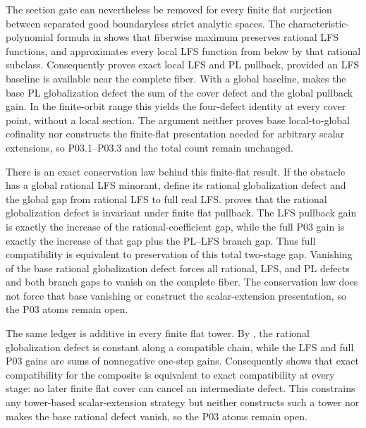 The section gate can nevertheless be removed for every finite flat
surjection between separated good boundaryless strict analytic spaces.
The characteristic-polynomial formula in
 shows that fiberwise maximum
preserves rational LFS functions, and
 approximates every local LFS
function from below by that rational subclass.  Consequently
 proves exact local LFS
and PL pullback, provided an LFS baseline is available near the complete
fiber.  With a global baseline,
 makes the base PL
globalization defect the sum of the cover defect and the global pullback
gain.  In the finite-orbit range this yields the four-defect identity at
every cover point, without a local section.  The argument neither proves
base local-to-global cofinality nor constructs the finite-flat presentation
needed for arbitrary scalar extensions, so P03.1--P03.3 and the total count
remain unchanged.

There is an exact conservation law behind this finite-flat result.  If the
obstacle has a global rational LFS minorant, define its rational
globalization defect and the global gap from rational LFS to full real LFS.
 proves that the rational
globalization defect is invariant under finite flat pullback.  The LFS
pullback gain is exactly the increase of the rational-coefficient gap, while
the full P03 gain is exactly the increase of that gap plus the PL--LFS branch
gap.  Thus full compatibility is equivalent to preservation of this total
two-stage gap.  Vanishing of the base rational globalization defect forces
all rational, LFS, and PL defects and both branch gaps to vanish on the
complete fiber.  The conservation law does not force that base vanishing or
construct the scalar-extension presentation, so the P03 atoms remain open.

The same ledger is additive in every finite flat tower.  By
, the rational
globalization defect is constant along a compatible chain, while the LFS and
full P03 gains are sums of nonnegative one-step gains.  Consequently
 shows that exact
compatibility for the composite is equivalent to exact compatibility at
every stage: no later finite flat cover can cancel an intermediate defect.
This constrains any tower-based scalar-extension strategy but neither
constructs such a tower nor makes the base rational defect vanish, so the P03
atoms remain open.

